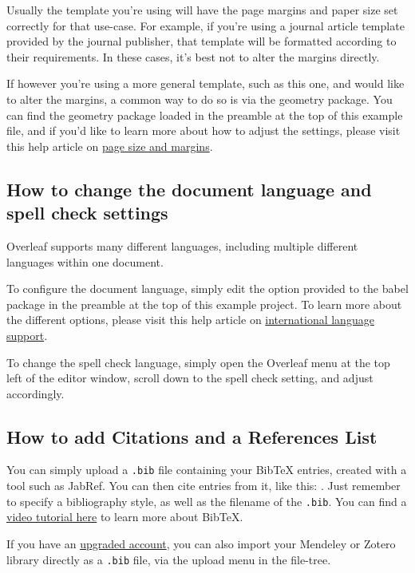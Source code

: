 \documentclass{article}
\begin{document}
\begin{itemize}
Usually the template you're using will have the page margins and paper size set correctly for that use-case. For example, if you're using a journal article template provided by the journal publisher, that template will be formatted according to their requirements. In these cases, it's best not to alter the margins directly.

If however you're using a more general template, such as this one, and would like to alter the margins, a common way to do so is via the geometry package. You can find the geometry package loaded in the preamble at the top of this example file, and if you'd like to learn more about how to adjust the settings, please visit this help article on \href{https://www.overleaf.com/learn/latex/page_size_and_margins}{page size and margins}.

\subsection{How to change the document language and spell check settings}

Overleaf supports many different languages, including multiple different languages within one document. 

To configure the document language, simply edit the option provided to the babel package in the preamble at the top of this example project. To learn more about the different options, please visit this help article on \href{https://www.overleaf.com/learn/latex/International_language_support}{international language support}.

To change the spell check language, simply open the Overleaf menu at the top left of the editor window, scroll down to the spell check setting, and adjust accordingly.

\subsection{How to add Citations and a References List}

You can simply upload a \verb|.bib| file containing your BibTeX entries, created with a tool such as JabRef. You can then cite entries from it, like this: \cite{greenwade93}. Just remember to specify a bibliography style, as well as the filename of the \verb|.bib|. You can find a \href{https://www.overleaf.com/help/97-how-to-include-a-bibliography-using-bibtex}{video tutorial here} to learn more about BibTeX.

If you have an \href{https://www.overleaf.com/user/subscription/plans}{upgraded account}, you can also import your Mendeley or Zotero library directly as a \verb|.bib| file, via the upload menu in the file-tree.


\end{itemize}
\end{document}
